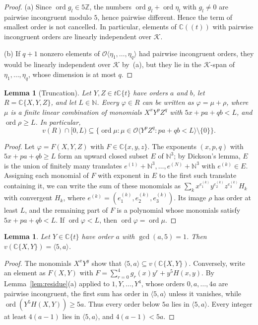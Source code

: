 \documentclass{amsart}
\newtheorem{lemma}[theorem]{Lemma}
\theoremstyle{definition}
\theoremstyle{remark}
\numberwithin{equation}{section}
\newcommand{\N}{\mathbb{N}}
\newcommand{\Z}{\mathbb{Z}}
\newcommand{\C}{\mathbb{C}}
\newcommand{\cO}{\mathcal{O}}
\newcommand{\cK}{\mathcal{K}}
\newcommand{\ord}{\operatorname{ord}}
\newcommand{\gen}[1]{\langle #1\rangle}
\newcommand{\Os}[1]{\cO\langle #1\rangle}
\begin{document}
\begin{proof}
(a) Since $\ord g_l\in5\Z$, the numbers $\ord g_l+\ord\eta_l$ with $g_l\ne0$ are pairwise incongruent modulo $5$, hence pairwise different. Hence the term of smallest order is not cancelled. In particular, elements of $\C((t))$ with pairwise incongruent orders are linearly independent over $\cK$.

(b) If $q+1$ nonzero elements of $\Os{\eta_1,\dots,\eta_q}$ had pairwise incongruent orders, they would be linearly independent over $\cK$ by~(a), but they lie in the $\cK$-span of $\eta_1,\dots,\eta_q$, whose dimension is at most $q$.
\end{proof}

\begin{lemma}[Truncation]\label{lem:truncation}
Let $Y,Z\in t\C\{t\}$ have orders $a$ and $b$, let $R=\C\{X,Y,Z\}$, and let $L\in\N$. Every $\varphi\in R$ can be written as $\varphi=\mu+\rho$, where $\mu$ is a finite linear combination of monomials $X^xY^pZ^q$ with $5x+pa+qb<L$, and $\ord\rho\ge L$. In particular,
\[
v(R)\cap[0,L)\subseteq\{\ord\mu:\mu\in\Os{Y^pZ^q: pa+qb<L}\setminus\{0\}\}.
\]
\end{lemma}

\begin{proof}
Let $\varphi=F(X,Y,Z)$ with $F\in\C\{x,y,z\}$. The exponents $(x,p,q)$ with $5x+pa+qb\ge L$ form an upward closed subset $E$ of $\N^3$; by Dickson's lemma, $E$ is the union of finitely many translates $e^{(1)}+\N^3,\dots,e^{(N)}+\N^3$ with $e^{(k)}\in E$. Assigning each monomial of $F$ with exponent in $E$ to the first such translate containing it, we can write the sum of these monomials as $\sum_k x^{e_1^{(k)}}y^{e_2^{(k)}}z^{e_3^{(k)}}H_k$ with convergent $H_k$, where $e^{(k)}=(e_1^{(k)},e_2^{(k)},e_3^{(k)})$. Its image $\rho$ has order at least $L$, and the remaining part of $F$ is a polynomial whose monomials satisfy $5x+pa+qb<L$. If $\ord\varphi<L$, then $\ord\varphi=\ord\mu$.
\end{proof}

\begin{lemma}\label{lem:plane}
Let $Y\in\C\{t\}$ have order $a$ with $\gcd(a,5)=1$. Then $v(\C\{X,Y\})=\gen{5,a}$.
\end{lemma}

\begin{proof}
The monomials $X^xY^y$ show that $\gen{5,a}\subseteq v(\C\{X,Y\})$. Conversely, write an element as $F(X,Y)$ with $F=\sum_{r=0}^{4}g_r(x)y^r+y^5H(x,y)$. By Lemma~\ref{lem:residue}(a) applied to $1,Y,\dots,Y^4$, whose orders $0,a,\dots,4a$ are pairwise incongruent, the first sum has order in $\gen{5,a}$ unless it vanishes, while $\ord(Y^5H(X,Y))\ge5a$. Thus every order below $5a$ lies in $\gen{5,a}$. Every integer at least $4(a-1)$ lies in $\gen{5,a}$, and $4(a-1)<5a$.
\end{proof}
\end{document}
